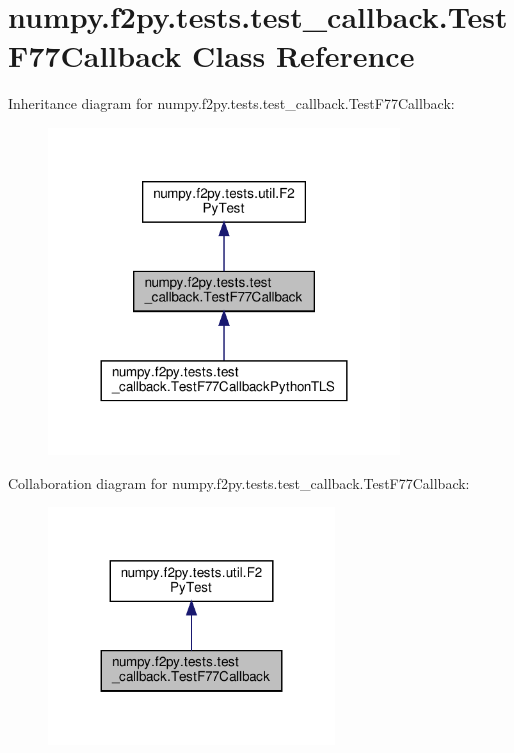 \hypertarget{classnumpy_1_1f2py_1_1tests_1_1test__callback_1_1TestF77Callback}{}\section{numpy.\+f2py.\+tests.\+test\+\_\+callback.\+Test\+F77\+Callback Class Reference}
\label{classnumpy_1_1f2py_1_1tests_1_1test__callback_1_1TestF77Callback}


Inheritance diagram for numpy.\+f2py.\+tests.\+test\+\_\+callback.\+Test\+F77\+Callback\+:
\nopagebreak
\begin{figure}[H]
\begin{center}
\leavevmode
\includegraphics[width=264pt]{classnumpy_1_1f2py_1_1tests_1_1test__callback_1_1TestF77Callback__inherit__graph}
\end{center}
\end{figure}


Collaboration diagram for numpy.\+f2py.\+tests.\+test\+\_\+callback.\+Test\+F77\+Callback\+:
\nopagebreak
\begin{figure}[H]
\begin{center}
\leavevmode
\includegraphics[width=215pt]{classnumpy_1_1f2py_1_1tests_1_1test__callback_1_1TestF77Callback__coll__graph}
\end{center}
\end{figure}
